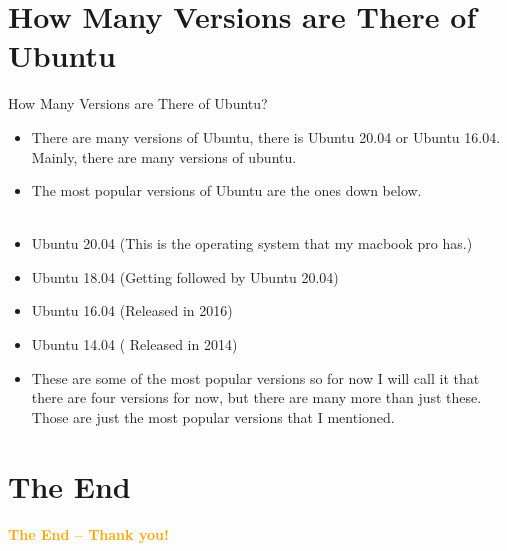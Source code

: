 \documentclass[aspectratio=43]{beamer}
\begin{document}
\section{How Many Versions are There of Ubuntu}
\begin{frame}{How Many Versions are There of Ubuntu?}
\begin{itemize}
\item There are many versions of Ubuntu, there is Ubuntu 20.04 or Ubuntu 16.04. Mainly, there are many versions of ubuntu.
\item The most popular versions of Ubuntu are the ones down below.
\\
~\\
\item Ubuntu 20.04 (This is the operating system that my macbook pro has.)
\item Ubuntu 18.04 (Getting followed by Ubuntu 20.04)
\item Ubuntu 16.04 (Released in 2016)
\item Ubuntu 14.04 ( Released in 2014)
\item These are some of the most popular versions so for now I will call it that there are four versions for now, but there are many more than just these. Those are just the most popular versions that I mentioned. 
\end{itemize}
\end{frame}

	
\section{The End}
    \begin{frame}{ }
        \centering
            \Huge\bfseries
        \textcolor{orange}{The End -- Thank you!}
    \end{frame}
\end{document}
